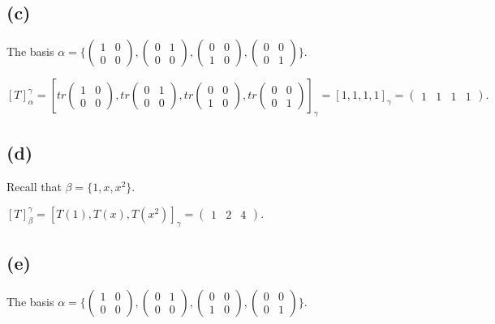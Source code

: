 \documentclass[12pt]{article}%
\begin{document}
\subsection{(c)}

The basis $\alpha=\{\begin{pmatrix}1&0\\0&0\end{pmatrix},\begin{pmatrix}0&1\\0&0\end{pmatrix},\begin{pmatrix}0&0\\1&0\end{pmatrix},\begin{pmatrix}0&0\\0&1\end{pmatrix}\}.$

$[T]_\alpha^{\gamma}=[tr \begin{pmatrix}1&0\\0&0\end{pmatrix},tr \begin{pmatrix}0&1\\0&0\end{pmatrix}, tr \begin{pmatrix}0&0\\1&0\end{pmatrix}, tr \begin{pmatrix}0&0\\0&1\end{pmatrix}]_\gamma=[1,1,1,1]_\gamma=\begin{pmatrix}1&1&1&1\end{pmatrix}.$

\subsection{(d)}

Recall that $\beta=\{1,x,x^2\}.$ 

$[T]_\beta^{\gamma}=[T(1),T(x),T(x^2)]_\gamma=\begin{pmatrix}1&2&4\end{pmatrix}.$

\subsection{(e)}

The basis $\alpha=\{\begin{pmatrix}1&0\\0&0\end{pmatrix},\begin{pmatrix}0&1\\0&0\end{pmatrix},\begin{pmatrix}0&0\\1&0\end{pmatrix},\begin{pmatrix}0&0\\0&1\end{pmatrix}\}.$
\end{document}
